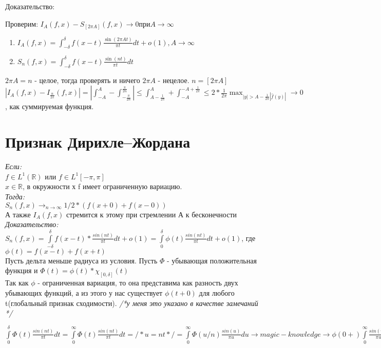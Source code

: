 \documentclass[paper=a4, fontsize=14pt]{report}
\begin{document}
Доказательство:

Проверим: $I_A(f,x) - S_{[2\pi A]}(f, x) \rightarrow 0 при A \rightarrow \infty$
\begin{enumerate}
	\item $I_A(f,x)=\int_{-\delta}^{\delta}f(x - t)\frac{\sin (2\pi A t)}{\pi t}dt + o(1), A\rightarrow\infty$
	\item $S_n(f,x)=\int_{-\delta}^{\delta}f(x - t)\frac{\sin(n t)}{\pi t}dt$
\end{enumerate}
$2 \pi A = n$ - целое, тогда проверять и ничего
$2 \pi A$ - нецелое. $n = [2\pi A]$
$|I_A(f,x) - I_{\frac{n}{2\pi}}(f,x)| = |\int_{-A}^{A} - \int_{-\frac{\pi}{2n}}^{\frac{\pi}{2n}}| \leq \int_{A - \frac{1}{2\pi}}^{A} + \int_{-A}^{-A + \frac{1}{2\pi}} \leq 2 * \frac{1}{2\pi} \max_{|y| > A - \frac{1}{2\pi}|\hat f(y)|} \rightarrow 0$, как суммируемая функция.


\section{Признак Дирихле--Жордана}
\emph{Если:} \\
	$f \in L^{1}(\mathds{R})$ или $f \in L^{1}[-\pi, \pi]$ \\
	$x \in \mathds{R}$, в окружности х f имеет ограниченную вариацию.\\
\emph {Тогда:} \\
   $S_n(f, x) \rightarrow_{n \rightarrow \infty} 1/2 * (f(x + 0) + f(x - 0))$ \\
   А также $I_A(f, x)$ стремится к этому при стремлении А к бесконечности
\emph{Доказательство:}\\
	$S_n(f, x) = \int\limits_{-\delta}^{\delta}f(x - t) * \frac{sin(n t)}{\pi t} dt + o(1) = \int\limits_{0}^{\delta} \phi(t) \frac{sin(n t)}{\pi t} dt + o(1) $, где $\phi(t) = f(x - t) + f(x + t)$ \\
	Пусть дельта меньше радиуса из условия. Пусть $\Phi$ - убывающая положительная функция и $\Phi(t) = \phi(t) * \chi_{[0, \delta]}(t)$ \\
	Так как $\phi$ - ограниченная вариация, то она представима как разность двух убывающих функций, а из этого у нас существует $\phi(t+0)$ для любого t(глобальный признак сходимости). \textit{/*у меня это указано в качестве замечаний */}
	
	$\int\limits_{0}^{\delta} \Phi(t) \frac{sin(n t)}{\pi t} dt = \int\limits_{0}^{\infty} \Phi(t) \frac{sin(n t)}{\pi t} dt = /* u=nt */ = \int\limits_{0}^{\infty} \Phi(u / n) \frac{sin(u)}{\pi u} du \rightarrow magic-knowledge \rightarrow \phi(0+) \int\limits_{0}^{\infty} \frac{sin(u)}{\pi u} du = 1 / 2 * \phi(0+)$
\end{document}
